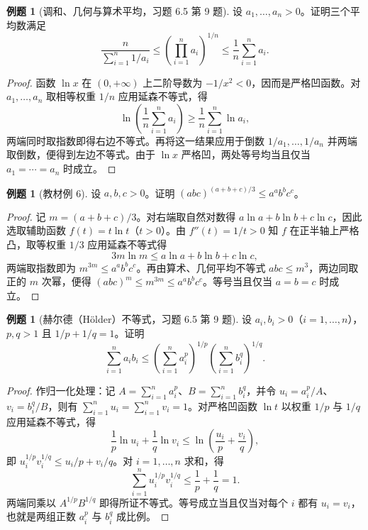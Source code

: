 \documentclass[UTF8,fontset=fandol,a4paper,12pt]{ctexart}
\theoremstyle{definition}
\newtheorem{example}[theorem]{例题}
\begin{document}
\begin{example}[调和、几何与算术平均，习题 6.5 第 9 题]
设 $a_1,\ldots,a_n>0$。证明三个平均数满足
\[
 \frac{n}{\sum_{i=1}^n 1/a_i}
 \le\left(\prod_{i=1}^n a_i\right)^{1/n}
 \le\frac1n\sum_{i=1}^n a_i.
\]
\end{example}

\begin{proof}
函数 $\ln x$ 在 $(0,+\infty)$ 上二阶导数为 $-1/x^2<0$，因而是严格凹函数。对 $a_1,\ldots,a_n$ 取相等权重 $1/n$ 应用延森不等式，得
\[
 \ln\!\left(\frac1n\sum_{i=1}^n a_i\right)\ge\frac1n\sum_{i=1}^n\ln a_i,
\]
两端同时取指数即得右边不等式。再将这一结果应用于倒数 $1/a_1,\ldots,1/a_n$ 并两端取倒数，便得到左边不等式。由于 $\ln x$ 严格凹，两处等号均当且仅当 $a_1=\cdots=a_n$ 时成立。
\end{proof}

\begin{example}[教材例 6]
设 $a,b,c>0$。证明 $(abc)^{(a+b+c)/3}\le a^a b^b c^c$。
\end{example}

\begin{proof}
记 $m=(a+b+c)/3$。对右端取自然对数得 $a\ln a+b\ln b+c\ln c$，因此选取辅助函数 $f(t)=t\ln t$（$t>0$）。由 $f''(t)=1/t>0$ 知 $f$ 在正半轴上严格凸，取等权重 $1/3$ 应用延森不等式得
\[
 3m\ln m\le a\ln a+b\ln b+c\ln c,
\]
两端取指数即为 $m^{3m}\le a^a b^b c^c$。再由算术、几何平均不等式 $abc\le m^3$，两边同取正的 $m$ 次幂，便得 $(abc)^m\le m^{3m}\le a^a b^b c^c$。等号当且仅当 $a=b=c$ 时成立。
\end{proof}

\begin{example}[赫尔德（Hölder）不等式，习题 6.5 第 9 题]
设 $a_i,b_i>0$（$i=1,\ldots,n$），$p,q>1$ 且 $1/p+1/q=1$。证明
\[
 \sum_{i=1}^n a_i b_i
 \le\left(\sum_{i=1}^n a_i^p\right)^{1/p}
       \left(\sum_{i=1}^n b_i^q\right)^{1/q}.
\]
\end{example}

\begin{proof}
作归一化处理：记 $A=\sum_{i=1}^n a_i^p$、$B=\sum_{i=1}^n b_i^q$，并令 $u_i=a_i^p/A$、$v_i=b_i^q/B$，则有 $\sum_{i=1}^n u_i=\sum_{i=1}^n v_i=1$。对严格凹函数 $\ln t$ 以权重 $1/p$ 与 $1/q$ 应用延森不等式，得
\[
 \frac1p\ln u_i+\frac1q\ln v_i\le\ln\!\left(\frac{u_i}{p}+\frac{v_i}{q}\right),
\]
即 $u_i^{1/p}v_i^{1/q}\le u_i/p+v_i/q$。对 $i=1,\ldots,n$ 求和，得
\[
 \sum_{i=1}^n u_i^{1/p}v_i^{1/q}\le\frac1p+\frac1q=1.
\]
两端同乘以 $A^{1/p}B^{1/q}$ 即得所证不等式。等号成立当且仅当对每个 $i$ 都有 $u_i=v_i$，也就是两组正数 $a_i^p$ 与 $b_i^q$ 成比例。
\end{proof}
\end{document}
